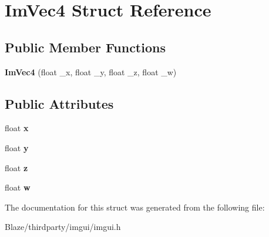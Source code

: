 \hypertarget{structImVec4}{}\section{Im\+Vec4 Struct Reference}
\label{structImVec4}
\subsection*{Public Member Functions}
\begin{DoxyCompactItemize}
\item 
\mbox{\label{structImVec4_af9e535f36b0fc7b9af0f60951fb4ffe4}} 
{\bfseries Im\+Vec4} (float \+\_\+x, float \+\_\+y, float \+\_\+z, float \+\_\+w)
\end{DoxyCompactItemize}
\subsection*{Public Attributes}
\begin{DoxyCompactItemize}
\item 
\mbox{\label{structImVec4_a2090f651f5e5b78fedae8dab87343db6}} 
float {\bfseries x}
\item 
\mbox{\label{structImVec4_a6b4d00ae261be4fe54353c759c561fe7}} 
float {\bfseries y}
\item 
\mbox{\label{structImVec4_aba6a75356917a28c967954bb29133a1a}} 
float {\bfseries z}
\item 
\mbox{\label{structImVec4_afeed5acd9f0d2043175f4da229d12a38}} 
float {\bfseries w}
\end{DoxyCompactItemize}


The documentation for this struct was generated from the following file\+:\begin{DoxyCompactItemize}
\item 
Blaze/thirdparty/imgui/imgui.\+h\end{DoxyCompactItemize}
